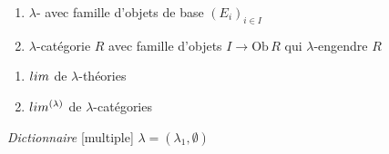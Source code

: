 \documentclass[11pt,a4paper]{article}
\begin{document}
\begin{enumerate}
  \item[{[T]}] $\lambda$-\struck{\ill{}}  avec famille
    d'objets de base \struck{\ill{}} $(E_{i})_{i \in I}$
  \item[{[R]}] $\lambda$-catégorie $R$ avec famille d'objets $I \to
    \mathrm{Ob}\,R$ qui $\lambda$-engendre $R$
\end{enumerate}

\begin{enumerate}
  \item[{[T]}] $\varprojlim$ de $\lambda$-théories
  \item[{[R]}] $\varinjlim^{(\lambda)}$ de $\lambda$-catégories
\end{enumerate}

\emph{Dictionnaire} [multiple] $\lambda = (\lambda_{1}, \emptyset)$
\end{document}
